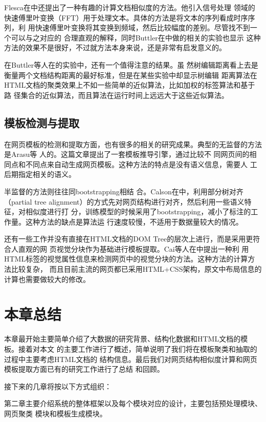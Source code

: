 Flesca在中还提出了一种有趣的计算文档相似度的方法。他引入信号处理
领域的快速傅里叶变换（FFT）用于处理文本。具体的方法是将文本的序列看成时序序列，利
用快速傅里叶变换将其变换到频域，然后比较幅度的差别。尽管找不到一个可以与之对应的
合理直观的解释，同时Buttler在中做的相关的实验也显示
这种方法的效果不是很好，不过就方法本身来说，还是非常有启发意义的。

在Buttler等人在的实验中，还有一个值得注意的结果。虽
然树编辑距离看上去是衡量两个文档结构距离的最好标准，但是在某些实验中却显示树编辑
距离算法在HTML文档的聚类效果上不如一些简单的近似算法，比如加权的标签算法和基于路
径集合的近似算法，而且算法在运行时间上远远大于这些近似算法。

\subsection{模板检测与提取}
\label{sec:relatedwork:template}
在网页模板的检测和提取方面，也有很多的相关的研究成果。典型的无监督的方法是Arasu等
人的。这篇文章提出了一套模板推导引擎，通过比较不
同网页间的相同点和不同点来自动生成网页模板。这种方法的特点是没有语义信息，需要人
工后期指定相关的语义。

半监督的方法则往往同bootstrapping相结
合。Calson在中，利用部分树对齐（partial
tree alignment）的方式先对网页结构进行对齐，然后利用一些语义特征，对相似度进行打
分，训练模型的时候采用了bootstrapping，减小了标注的工作量。这种方法的缺点是算法运
行速度较慢，不适用于数据量较大的情况。

还有一些工作并没有直接在HTML文档的DOM Tree的层次上进行，而是采用更符合人直观的网
页视觉分块作为基础进行模板提取。Cai等人在中提出一种利
用HTML标签的视觉属性信息来检测网页中的视觉分块的方法。这种方法的计算方法比较复杂，
而且目前主流的网页都已采用HTML+CSS架构，原文中布局信息的计算也需要做较大的修改。
\section{本章总结}
\label{sec:summaryintro}
本章最开始主要简单介绍了大数据的研究背景、结构化数据和HTML文档的模板。接着对本文
的主要工作进行了概述，简单说明了我们将在模板聚类和抽取的过程中主要考虑HTML文档的
结构信息。最后我们对网页结构相似度计算和网页模板提取方面已有的研究工作进行了总结
和回顾。

接下来的几章将按以下方式组织：

第二章主要介绍系统的整体框架以及每个模块对应的设计，主要包括预处理模块、网页聚类
模块和模板生成模块。

